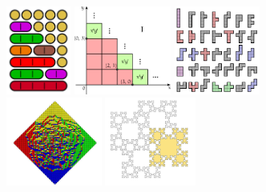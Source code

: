 \begin{figure}[h]
  \begin{center}
    \includegraphics[height=2.9cm]{images/partitions-of-5}
    \includegraphics[height=2.9cm]{images/Wikipic}
    \includegraphics[height=2.9cm]{images/hexominoes}
    \includegraphics[height=2.9cm]{images/AztecDiamond}
    \includegraphics[height=2.9cm]{images/619px-Tiling_Fibonacci_word_fractal}
    \medskip


\end{center}
\end{figure}
